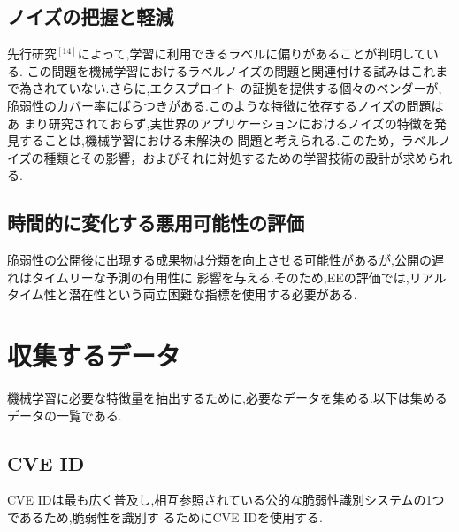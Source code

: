 \documentclass[submit,techreq,noauthor]{eco}	%
\begin{document}
\subsection*{ノイズの把握と軽減}
先行研究\begin{math}^{[14]}\end{math}によって,学習に利用できるラベルに偏りがあることが判明している.
この問題を機械学習におけるラベルノイズの問題と関連付ける試みはこれまで為されていない.さらに,エクスプロイト
の証拠を提供する個々のベンダーが,脆弱性のカバー率にばらつきがある.このような特徴に依存するノイズの問題はあ
まり研究されておらず,実世界のアプリケーションにおけるノイズの特徴を発見することは,機械学習における未解決の
問題と考えられる.このため，ラベルノイズの種類とその影響，およびそれに対処するための学習技術の設計が求められる.

\subsection*{時間的に変化する悪用可能性の評価}
脆弱性の公開後に出現する成果物は分類を向上させる可能性があるが,公開の遅れはタイムリーな予測の有用性に
影響を与える.そのため,EEの評価では,リアルタイム性と潜在性という両立困難な指標を使用する必要がある.

\section{収集するデータ}
機械学習に必要な特徴量を抽出するために,必要なデータを集める.以下は集めるデータの一覧である.

\subsection*{CVE ID}
CVE IDは最も広く普及し,相互参照されている公的な脆弱性識別システムの1つであるため,脆弱性を識別す
るためにCVE IDを使用する.
\end{document}
